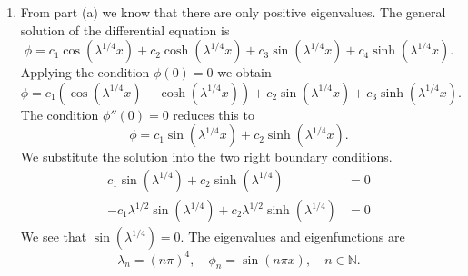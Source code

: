 {\begin{Solution}
\begin{enumerate}
    Let $v_k$ and $v_m$ be eigenfunctions corresponding to the distinct 
    eigenvalues $\lambda_k$ and $\lambda_m$.  We start with Green's identity.
    \begin{align*}
      \langle v_k, L[v_m] \rangle - \langle L[v_k], v_m \rangle = 0 \\
      \langle v_k, \lambda_m s v_m \rangle - \langle \lambda_k s v_k, v_m \rangle = 0 \\
      (\lambda_m - \lambda_k) \langle v_k, s v_m \rangle = 0 \\
      \langle v_k, s v_m \rangle = 0 
    \end{align*}
    The eigenfunctions are orthogonal with respect to the weighting function $s$.
  \item
    From part (a) we know that there are only positive eigenvalues.
    The general solution of the differential equation is
    \[
    \phi = c_1 \cos( \lambda^{1/4} x ) + c_2 \cosh( \lambda^{1/4} x )
    + c_3 \sin( \lambda^{1/4} x ) + c_4 \sinh( \lambda^{1/4} x ).
    \]
    Applying the condition $\phi(0) = 0$ we obtain
    \[
    \phi = c_1 ( \cos( \lambda^{1/4} x ) - \cosh( \lambda^{1/4} x ) )
    + c_2 \sin( \lambda^{1/4} x ) + c_3 \sinh( \lambda^{1/4} x ).
    \]
    The condition $\phi''(0) = 0$ reduces this to
    \[
    \phi = c_1 \sin( \lambda^{1/4} x ) + c_2 \sinh( \lambda^{1/4} x ).
    \]
    We substitute the solution into the two right boundary conditions.
    \begin{align*}
      c_1 \sin( \lambda^{1/4} ) + c_2 \sinh( \lambda^{1/4} ) &= 0 \\
      - c_1 \lambda^{1/2} \sin( \lambda^{1/4} ) 
      + c_2 \lambda^{1/2} \sinh( \lambda^{1/4} ) &= 0 
    \end{align*}
    We see that $\sin( \lambda^{1/4} ) = 0$.  The eigenvalues and eigenfunctions
    are
    \[
    \lambda_n = (n \pi)^4, \quad \phi_n = \sin( n \pi x ), \quad n \in \mathbb{N}.
    \]
  \end{enumerate}
\end{Solution}



\raggedbottom
}
